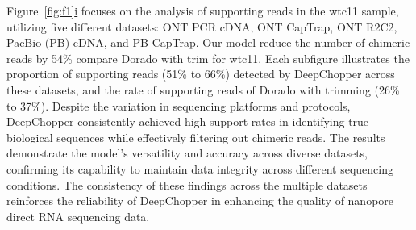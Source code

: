 \documentclass[pdflatex, sn-mathphys-num, lineno]{sn-jnl}%
\newcommand{\chopper}{DeepChopper\xspace}
\newcommand{\figref}[2]{Figure~\hyperref[#1]{\ref*{#1}#2}}
\theoremstyle{thmstyleone}%
\theoremstyle{thmstyletwo}%
\theoremstyle{thmstylethree}%
\begin{document}
\figref{fig:f1}{i} focuses on the analysis of supporting reads in the wtc11 sample, utilizing five different datasets: ONT PCR cDNA, ONT CapTrap, ONT R2C2, PacBio (PB) cDNA, and PB CapTrap.
Our model reduce the number of chimeric reads by 54\% compare Dorado with trim for wtc11.
Each subfigure illustrates the proportion of supporting reads (51\% to 66\%) detected by \chopper across these datasets, and the rate of supporting reads of Dorado with trimming (26\% to 37\%).
Despite the variation in sequencing platforms and protocols, \chopper consistently achieved high support rates in identifying true biological sequences while effectively filtering out chimeric reads.
The results demonstrate the model's versatility and accuracy across diverse datasets, confirming its capability to maintain data integrity across different sequencing conditions.
The consistency of these findings across the multiple datasets reinforces the reliability of \chopper in enhancing the quality of nanopore direct RNA sequencing data.
\end{document}
